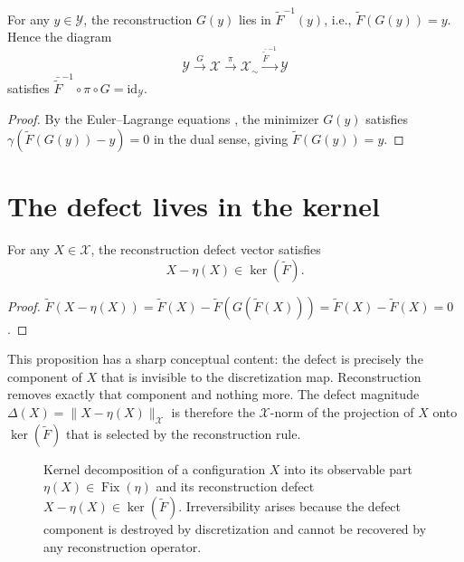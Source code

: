 \documentclass[12pt, oneside]{memoir}
\DeclareMathOperator{\Fix}{Fix}
\newcommand{\X}{\mathcal{X}}
\newcommand{\Ft}{\widetilde{F}}
\newcommand{\nnorm}[1]{\lVert #1 \rVert}
\begin{document}
\begin{proposition}
\label{prop:section}
For any $y \in \mathcal{Y}$, the reconstruction $G(y)$ lies in $\Ft^{-1}(y)$, i.e.,
$\Ft(G(y)) = y$.  Hence the diagram
\[
  \mathcal{Y} \xrightarrow{G} \X \xrightarrow{\pi} \X_\sim \xrightarrow{\bar\Ft^{-1}} \mathcal{Y}
\]
satisfies $\bar\Ft^{-1} \circ \pi \circ G = \mathrm{id}_{\mathcal{Y}}$.
\end{proposition}

\begin{proof}
By the Euler--Lagrange equations , the minimizer $G(y)$
satisfies $\gamma(\Ft(G(y)) - y) = 0$ in the dual sense, giving $\Ft(G(y)) = y$.
\end{proof}

\section{The defect lives in the kernel}

\begin{proposition}
\label{prop:defect-kernel}
For any $X \in \X$, the reconstruction defect vector satisfies
\[
  X - \eta(X) \in \ker(\Ft).
\]
\end{proposition}

\begin{proof}
$\Ft(X - \eta(X)) = \Ft(X) - \Ft(G(\Ft(X))) = \Ft(X) - \Ft(X) = 0$.
\end{proof}

This proposition has a sharp conceptual content: the defect is precisely the component
of $X$ that is invisible to the discretization map.  Reconstruction removes exactly that
component and nothing more.  The defect magnitude $\Delta(X) = \nnorm{X - \eta(X)}_\X$
is therefore the $\X$-norm of the projection of $X$ onto $\ker(\Ft)$ that is selected
by the reconstruction rule.

\begin{figure}[htbp]
\centering
{}
\caption{Kernel decomposition of a configuration $X$ into its observable part
$\eta(X) \in \Fix(\eta)$ and its reconstruction defect $X - \eta(X) \in \ker(\Ft)$.
Irreversibility arises because the defect component is destroyed by discretization and
cannot be recovered by any reconstruction operator.}
\label{fig:kernel-decomp}
\end{figure}
\end{document}

